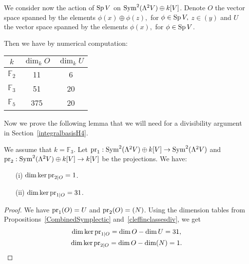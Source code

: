 We consider now the action of $\operatorname{Sp} V$ on $\operatorname{Sym}^2 (\Lambda^2V)\oplus k[V]$. 
Denote $O$ the vector space spanned by the elements $\phi(x)\oplus \phi(z),$ for $\phi \in \operatorname{Sp} V,$ $z \in (y)$
and $U$ the vector space spanned by the elements $\phi(x),$ for $\phi \in \operatorname{Sp} V$.
\begin{proposition}\label{CombinedSymplectic}
Then we have by numerical computation:
\vspace{2mm}
\begin{center}
\begin{tabular}{c||c|c}
 $k$ & $\dim_k O$  & $\dim_k U$\\
\hline
$\mathbb F_2$ & 11 & 6 \\
$\mathbb F_3$ & 51  & 20 \\
$\mathbb F_5$ & 375  & 20 
\end{tabular}
\end{center}
\end{proposition}
Now we prove the following lemma that we will need for a divisibility argument in Section~\ref{integralbasisH4}.
\begin{lemme}\label{cleffinclassesdiv}
We assume that $k=\mathbb F_3$. Let $\operatorname{pr}_1: \operatorname{Sym}^2 (\Lambda^2V)\oplus k[V]\rightarrow \operatorname{Sym}^2 (\Lambda^2V)$ and $\operatorname{pr}_2: \operatorname{Sym}^2 (\Lambda^2V)\oplus k[V]\rightarrow k[V]$ be the projections. 
We have: 
\begin{itemize}
\item[(i)]
$\dim \ker\operatorname{pr}_{2|O}=1$.
\item[(ii)]
$\dim \ker\operatorname{pr}_{1|O}=31$.
\end{itemize}
\end{lemme}
\begin{proof}
We have $\operatorname{pr}_{1}(O)=U$ and $\operatorname{pr}_{2}(O)=(N)$. Using the dimension tables from Propositions~\ref{CombinedSymplectic} and~\ref{cleffinclassesdiv}, we get
\begin{gather*}
\dim \ker\operatorname{pr}_{1|O} = \dim O - \dim U  = 31,\\
\dim \ker\operatorname{pr}_{2|O} = \dim O - \dim (N) = 1.
\qedhere
\end{gather*}
\end{proof}
